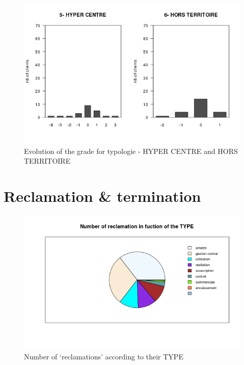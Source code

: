 \documentclass[a4paper, 11pt]{article}
\begin{document}
    \begin{figure}[!ht]
            \centering
            \includegraphics[height = 10 cm]{Remi/Evolution_of_the_grade_for_typologie_6-HORS-TERRITOIRE.png}
            \caption{Evolution of the grade for typologie - HYPER CENTRE and HORS TERRITOIRE}
            \label{fig:e_typo6}
    \end{figure}
    
        
\clearpage
\section{Reclamation \& termination}
    \begin{figure}[!ht]
    	\centering
            \includegraphics[height = 10 cm]{Valentin/Number_of_reclamation_in_fuction_of_the_TYPE.png}
            \caption{Number of `reclamations' according to their TYPE}
            \label{fig:reclamtion_type}
    \end{figure}
    
\end{document}
